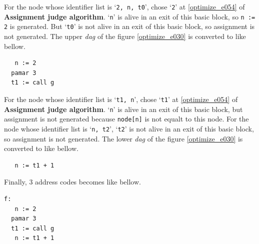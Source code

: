 \begin{Example}
For the node whose identifier list is `{\tt{2, n, t0}}',
chose `{\tt{2}}' at \ref{optimize_e054} of {\bf Assignment judge
 algorithm}.
`{\tt{n}}' is alive in an exit of this basic block, so
{\tt{n := 2}} is generated. But
`{\tt{t0}}' is not alive in an exit of this basic block, so
assignment is not generated.
The upper {\em dag} of the figure \ref{optimize_e030} 
is converted to like bellow.
\begin{verbatim}
   n := 2
  pamar 3
  t1 := call g
\end{verbatim}
For the node whose identifier list is `{\tt{t1, n}}',
chose `{\tt{t1}}' at \ref{optimize_e054} of {\bf Assignment judge
 algorithm}.
`{\tt{n}}' is alive in an exit of this basic block, but
assignment is not generated because {\tt{node[n]}} is
not equalt to this node.
For the node whose identifier list is `{\tt{n, t2}}',
`{\tt{t2}}' is not alive in an exit of this basic block, 
so assignment is not generated.
The lower {\em dag} of the figure \ref{optimize_e030} 
is converted to like bellow.
\begin{verbatim}
   n := t1 + 1
\end{verbatim}
Finally, 3 address codes becomes like bellow.
\begin{verbatim}
f:
   n := 2
  pamar 3
  t1 := call g
   n := t1 + 1
\end{verbatim}
\end{Example}

